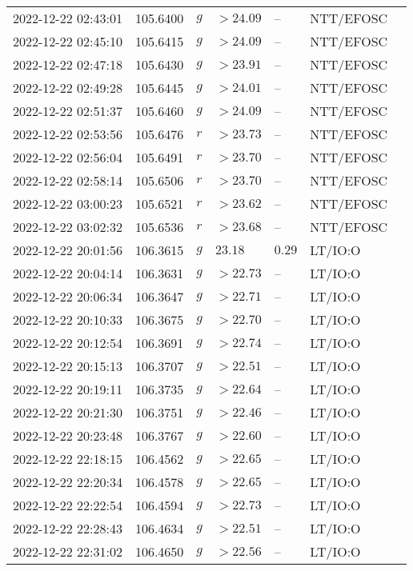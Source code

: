 \documentclass{nature_plusfigure}
\begin{document}
\begin{supplement}
\begin{center}
\begin{longtable}{lllllll}
2022-12-22 02:43:01 & 105.6400 & $g$ & $>24.09$ & -- & NTT/EFOSC &  \\ 
2022-12-22 02:45:10 & 105.6415 & $g$ & $>24.09$ & -- & NTT/EFOSC &  \\ 
2022-12-22 02:47:18 & 105.6430 & $g$ & $>23.91$ & -- & NTT/EFOSC &  \\ 
2022-12-22 02:49:28 & 105.6445 & $g$ & $>24.01$ & -- & NTT/EFOSC &  \\ 
2022-12-22 02:51:37 & 105.6460 & $g$ & $>24.09$ & -- & NTT/EFOSC &  \\ 
2022-12-22 02:53:56 & 105.6476 & $r$ & $>23.73$ & -- & NTT/EFOSC &  \\ 
2022-12-22 02:56:04 & 105.6491 & $r$ & $>23.70$ & -- & NTT/EFOSC &  \\ 
2022-12-22 02:58:14 & 105.6506 & $r$ & $>23.70$ & -- & NTT/EFOSC &  \\ 
2022-12-22 03:00:23 & 105.6521 & $r$ & $>23.62$ & -- & NTT/EFOSC &  \\ 
2022-12-22 03:02:32 & 105.6536 & $r$ & $>23.68$ & -- & NTT/EFOSC &  \\ 
2022-12-22 20:01:56 & 106.3615 & $g$ & $23.18$ & $0.29$ & LT/IO:O &  \\ 
2022-12-22 20:04:14 & 106.3631 & $g$ & $>22.73$ & -- & LT/IO:O &  \\ 
2022-12-22 20:06:34 & 106.3647 & $g$ & $>22.71$ & -- & LT/IO:O &  \\ 
2022-12-22 20:10:33 & 106.3675 & $g$ & $>22.70$ & -- & LT/IO:O &  \\ 
2022-12-22 20:12:54 & 106.3691 & $g$ & $>22.74$ & -- & LT/IO:O &  \\ 
2022-12-22 20:15:13 & 106.3707 & $g$ & $>22.51$ & -- & LT/IO:O &  \\ 
2022-12-22 20:19:11 & 106.3735 & $g$ & $>22.64$ & -- & LT/IO:O &  \\ 
2022-12-22 20:21:30 & 106.3751 & $g$ & $>22.46$ & -- & LT/IO:O &  \\ 
2022-12-22 20:23:48 & 106.3767 & $g$ & $>22.60$ & -- & LT/IO:O &  \\ 
2022-12-22 22:18:15 & 106.4562 & $g$ & $>22.65$ & -- & LT/IO:O &  \\ 
2022-12-22 22:20:34 & 106.4578 & $g$ & $>22.65$ & -- & LT/IO:O &  \\ 
2022-12-22 22:22:54 & 106.4594 & $g$ & $>22.73$ & -- & LT/IO:O &  \\ 
2022-12-22 22:28:43 & 106.4634 & $g$ & $>22.51$ & -- & LT/IO:O &  \\ 
2022-12-22 22:31:02 & 106.4650 & $g$ & $>22.56$ & -- & LT/IO:O &  \\ 

\end{longtable}
\end{center}
\end{supplement}
\end{document}
